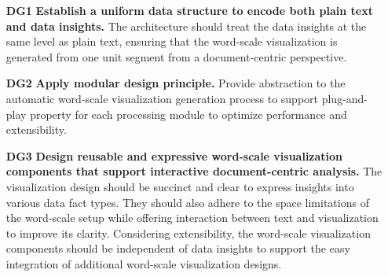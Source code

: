 \begin{enumerate}%
    \item[\textbf{DG1}] \textbf{Establish a uniform data structure to encode both plain text and data insights.} The architecture should treat the data insights at the same level as plain text, ensuring that the word-scale visualization is generated from one unit segment from a document-centric perspective.%
    \item[\textbf{DG2}] \textbf{Apply modular design principle.} Provide abstraction to the automatic word-scale visualization generation process to support plug-and-play property for each processing module to optimize performance and extensibility.
    \item[\textbf{DG3}] \textbf{Design reusable and expressive word-scale visualization components that support interactive document-centric analysis.} The visualization design should be succinct and clear to express insights into various data fact types. They should also adhere to the space limitations of the word-scale setup while offering interaction between text and visualization to improve its clarity. Considering extensibility, the word-scale visualization components should be independent of data insights to support the easy integration of additional word-scale visualization designs.
\end{enumerate}
